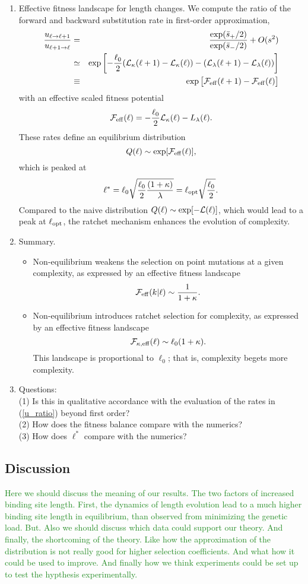 \documentclass[10pt,a4paper]{article}
\renewcommand{\L}{{\cal L}}
\newcommand{\F}{{\cal F}}
\newcommand{\EQ}{\begin{equation}}
\newcommand{\EE}{\end{equation}}
\newcommand{\EQA}{\begin{eqnarray}}
\newcommand{\EEA}{\end{eqnarray}}
\begin{document}
{\begin{enumerate}
\item Effective fitness landscape for length changes. We compute the ratio of the forward and backward substitution rate in first-order approximation,
\EQA
\frac{u_{\ell \to \ell+1}}{u_{\ell + 1 \to \ell}} & = & \frac{\exp(\bar s_+/2)}{\exp(\bar s_-/2)} +O(s^2)
\\
& \simeq & \exp \left [ - \frac{\ell_0}{2} (\L_\kappa (\ell+1) - \L_\kappa (\ell)) - (\L_\lambda (\ell+1) - \L_\lambda (\ell)) \right ]
\\
& \equiv & \exp \big [ \F_{\rm eff} (\ell+1) - \F_{\rm eff} (\ell) \big ]
\label{u_ratio}
\EEA
with an effective scaled fitness potential
\EQ
\F_{\rm eff} (\ell) = - \frac{\ell_0}{2} \L_\kappa (\ell) - L_\lambda (\ell) .
 \EE
These rates define an equilibrium distribution
\EQ
Q(\ell) \sim \exp [ \F_{\rm eff} (\ell)],
\EE
which is peaked at
\EQ
\ell^* = \ell_0 \sqrt{ \frac{\ell_0}{2} \frac{(1+\kappa)}{\lambda}} = \ell_{\rm opt} \sqrt{ \frac{\ell_0}{2}} .
\EE
Compared to the naive distribution $Q(\ell) \sim \exp [ - \L (\ell)]$, which would lead to a peak at $\ell_{\rm opt}$, the ratchet mechanism enhances the evolution of complexity.

\item Summary.
\begin{itemize}
\item Non-equilibrium weakens the selection on point mutations at a given complexity, as expressed by an effective fitness landscape
\EQ
\F_{\rm eff} (k|\ell) \sim \frac{1}{1 + \kappa} .
\EE
\item Non-equilibrium introduces ratchet selection for complexity, as expressed by an effective fitness landscape
\EQ
\F_{\kappa, \rm eff} (\ell) \sim \ell_0(1+ \kappa).
\EE
This landscape is proportional to $\ell_0$; that is, complexity begets more complexity.
\end{itemize}

\item Questions:\\
(1) Is this in qualitative accordance with the evaluation of the rates in (\ref{u_ratio}) beyond first order?
\\
(2) How does the fitness balance compare with the numerics?
\\
(3) How does $\ell^*$ compare with the numerics?
\end{enumerate}
}



\subsection*{Discussion}
\textcolor{ForestGreen}{Here we should discuss the meaning of our results. The two factors of increased binding site length. First, the dynamics of length evolution lead to a much higher binding site length in equilibrium, than observed from minimizing the genetic load. But. Also we should discuss which data could support our theory. And finally, the shortcoming of the theory. Like how the approximation of the distribution is not really good for higher selection coefficients. And what how it could be used to improve. And finally how we think experiments could be set up to test the hypthesis experimentally.}
\end{document}
